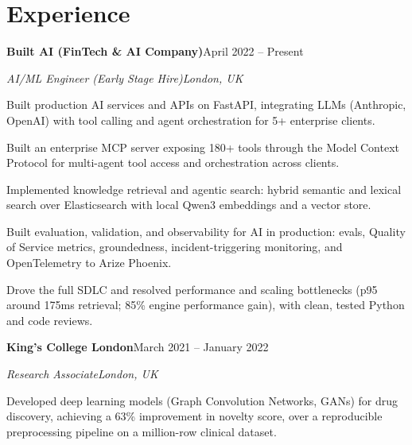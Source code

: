 \documentclass[10pt,a4paper]{article}
\newcommand{\entry}[4]{%
  {\color{company}\bfseries #1}\hfill {\color{muted}#2}\par
  \vspace{1pt}
  {\itshape #3}\hfill {\color{muted}\itshape #4}\par
  \vspace{3pt}%
}
\begin{document}
\section{Experience}
\entry{Built AI (FinTech \& AI Company)}{April 2022 -- Present}{AI/ML Engineer (Early Stage Hire)}{London, UK}
\begin{tight}
  \item Built production AI services and APIs on FastAPI, integrating LLMs (Anthropic, OpenAI) with tool calling and agent orchestration for 5+ enterprise clients.
  \item Built an enterprise MCP server exposing 180+ tools through the Model Context Protocol for multi-agent tool access and orchestration across clients.
  \item Implemented knowledge retrieval and agentic search: hybrid semantic and lexical search over Elasticsearch with local Qwen3 embeddings and a vector store.
  \item Built evaluation, validation, and observability for AI in production: evals, Quality of Service metrics, groundedness, incident-triggering monitoring, and OpenTelemetry to Arize Phoenix.
  \item Drove the full SDLC and resolved performance and scaling bottlenecks (p95 around 175ms retrieval; 85\% engine performance gain), with clean, tested Python and code reviews.
\end{tight}

\entry{King's College London}{March 2021 -- January 2022}{Research Associate}{London, UK}
\begin{tight}
  \item Developed deep learning models (Graph Convolution Networks, GANs) for drug discovery, achieving a 63\% improvement in novelty score, over a reproducible preprocessing pipeline on a million-row clinical dataset.
\end{tight}

\end{document}
